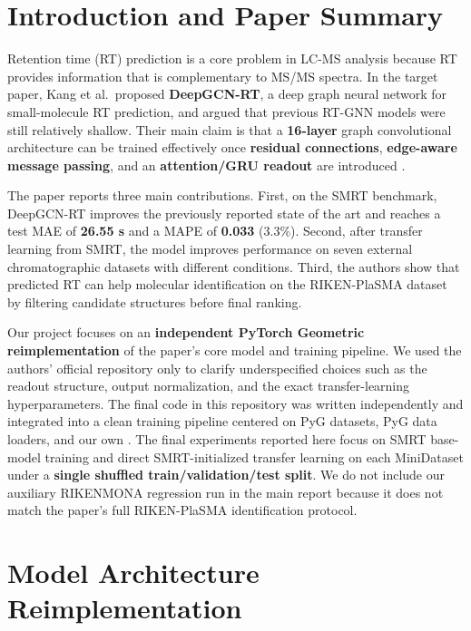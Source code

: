 
\section{Introduction and Paper Summary}

Retention time (RT) prediction is a core problem in LC-MS analysis because RT provides information that is complementary to MS/MS spectra. In the target paper, Kang et al.\ proposed \textbf{DeepGCN-RT}, a deep graph neural network for small-molecule RT prediction, and argued that previous RT-GNN models were still relatively shallow. Their main claim is that a \textbf{16-layer} graph convolutional architecture can be trained effectively once \textbf{residual connections}, \textbf{edge-aware message passing}, and an \textbf{attention/GRU readout} are introduced \cite{kang2023deepgcnrt}.

The paper reports three main contributions. First, on the SMRT benchmark, DeepGCN-RT improves the previously reported state of the art and reaches a test MAE of \textbf{26.55 s} and a MAPE of \textbf{0.033} (3.3\%). Second, after transfer learning from SMRT, the model improves performance on seven external chromatographic datasets with different conditions. Third, the authors show that predicted RT can help molecular identification on the RIKEN-PlaSMA dataset by filtering candidate structures before final ranking.

Our project focuses on an \textbf{independent PyTorch Geometric reimplementation} of the paper's core model and training pipeline. We used the authors' official repository only to clarify underspecified choices such as the readout structure, output normalization, and the exact transfer-learning hyperparameters. The final code in this repository was written independently and integrated into a clean training pipeline centered on PyG datasets, PyG data loaders, and our own . The final experiments reported here focus on SMRT base-model training and direct SMRT-initialized transfer learning on each MiniDataset under a \textbf{single shuffled train/validation/test split}. We do not include our auxiliary RIKENMONA regression run in the main report because it does not match the paper's full RIKEN-PlaSMA identification protocol.

\section{Model Architecture Reimplementation}

